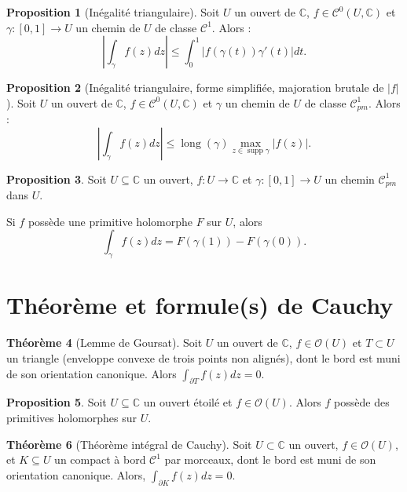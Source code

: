 \documentclass[11pt,a4paper]{article}
\newcommand{\C}{\mathbb{C}}
\DeclareMathOperator{\supp}{supp}
\theoremstyle{definition}
\newtheorem{theoreme}{Th\'eor\`eme}[section]
\newtheorem{proposition}[theoreme]{Proposition}
\newtheorem{prop}[theoreme]{Proposition}
\theoremstyle{plain}
\begin{document}
\begin{prop}[Inégalité triangulaire]
Soit $U$ un ouvert de $\C$, $f\in \mathcal C^0(U,\C)$ et $\gamma:[0,1]\to U$ un chemin de $U$ de classe $\mathcal C^1$.
Alors :
\[ \left| \int_\gamma f(z)dz\right| \leq \int_0^1 \left|f(\gamma(t))\gamma'(t)\right|dt.\]
\end{prop}

\begin{prop}[Inégalité triangulaire, forme simplifiée, majoration brutale de $|f|$]
Soit $U$ un ouvert de $\C$, $f\in \mathcal C^0(U,\C)$ et $\gamma$ un chemin de $U$ de classe $\mathcal C^1_{pm}$.
Alors :
\[ \left| \int_\gamma f(z)dz\right| \leq \operatorname{long}(\gamma)\max_{z\in \supp \gamma}|f(z)|.\]
\end{prop}

\begin{proposition}
Soit $U\subseteq \C$ un ouvert, $f:U\to\C$  et $\gamma : [0,1]\to U$ un chemin $\mathcal C^1_{pm}$ dans $U$.

Si $f$ possède une primitive holomorphe $F$ sur $U$, alors  
\[\int_\gamma f(z)dz = F(\gamma(1)) - F(\gamma(0)).\]
\end{proposition}





\section{Théorème et formule(s) de Cauchy}

\begin{theoreme}[Lemme de Goursat]
Soit $U$ un ouvert de $\C$,  $f\in \mathcal O(U)$ et $T\subset U$ un triangle (enveloppe convexe de trois points non alignés), dont le bord est muni de son orientation canonique.
Alors $\int_{\partial T} f(z)dz=0$.
\end{theoreme}

\begin{prop}
Soit $U\subseteq \C$ un ouvert étoilé et $f\in \mathcal O(U)$.
Alors $f$ possède des primitives holomorphes sur $U$.
\end{prop}

\begin{theoreme}[Théorème intégral de Cauchy]
Soit $U\subset \C$ un ouvert, $f\in \mathcal O(U)$, et $K\subseteq U$ un compact à bord $\mathcal C^1$ par morceaux, dont le bord est muni de son orientation canonique.
Alors, $\int_{\partial K} f(z)dz = 0$.
\end{theoreme}
\end{document}
